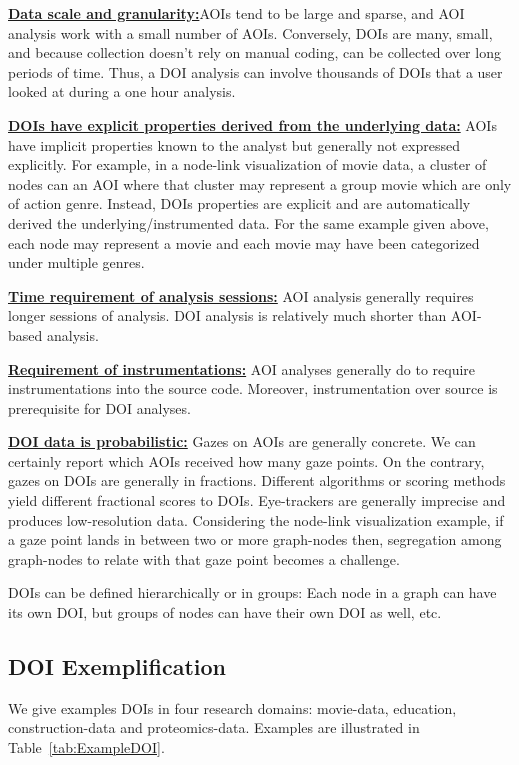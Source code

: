 \textbf{\underline{Data scale and granularity:}}AOIs tend to be large and sparse, and AOI analysis work with a small number of AOIs. Conversely, DOIs are many, small, and because collection doesn't rely on manual coding, can be collected over long periods of time. Thus, a DOI analysis can involve thousands of DOIs that a user looked at during a one hour analysis.

\textbf{\uline{DOIs have explicit properties derived from the underlying data:}} AOIs have implicit properties known to the analyst but generally not expressed explicitly. For example, in a node-link visualization of movie data, a cluster of nodes can an AOI where that cluster may represent a group movie which are only of action genre. Instead, DOIs properties are explicit and are automatically derived the underlying/instrumented data. For the same example given above, each node may represent a movie and each movie may have been categorized under multiple genres. 

\textbf{\underline{Time requirement of analysis sessions:}} AOI analysis generally requires longer sessions of analysis. DOI analysis is relatively much shorter than AOI-based analysis.

\textbf{\underline{Requirement of instrumentations:}} AOI analyses generally do to require instrumentations into the source code. Moreover, instrumentation over source is prerequisite for DOI analyses. 

\textbf{\underline{DOI data is probabilistic:}}  Gazes on AOIs are generally concrete. We can certainly report which AOIs received how many gaze points. On the contrary, gazes on DOIs are generally in fractions. Different algorithms or scoring methods yield different fractional scores to DOIs. Eye-trackers are generally imprecise and produces low-resolution data. Considering the node-link visualization example, if a gaze point lands in between two or more graph-nodes then, segregation among graph-nodes to relate with that gaze point becomes a challenge. 

DOIs can be defined hierarchically or in groups: Each node in a graph can have its own DOI, but groups of nodes can have their own DOI as well, etc.

\subsection{DOI Exemplification}
We give examples DOIs in four research domains: movie-data, education, construction-data and proteomics-data. Examples are illustrated in Table~\ref{tab:ExampleDOI}. 

